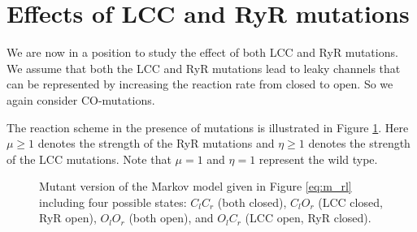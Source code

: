 \section{Effects of LCC and RyR mutations}

We are now in a position to study the effect of both LCC and RyR
mutations. We assume that both the LCC and RyR mutations lead to leaky
channels that can be represented by increasing the reaction rate from
closed to open. So we again consider CO-mutations.

The reaction scheme in the presence of mutations is illustrated in Figure \ref{Eq:m_rl_m}.
Here $\mu\geq1$ denotes the
strength of the RyR mutations and $\eta\geq1$ denotes the strength of the LCC
mutations. Note that $\mu=1$ and $\eta=1$ represent the wild type.

\begin{figure}[ptb]
\begin{center}
\end{center}
\caption{Mutant version of the Markov model given in Figure \ref{eq:m_rl}
including four possible states: $C_{l}C_{r}$ (both
closed), $C_{l}O_{r}$ (LCC closed, RyR open), $O_{l}O_{r}$ (both open), and
$O_{l}C_{r}$ (LCC open, RyR closed).}
\label{Eq:m_rl_m}
\end{figure}



